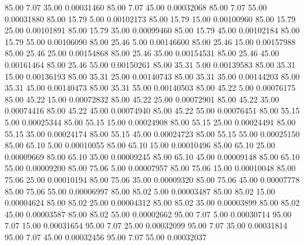      85.00      7.07     35.00     0.00031460
     85.00      7.07     45.00     0.00032068
     85.00      7.07     55.00     0.00031880
     85.00     15.79      5.00     0.00102173
     85.00     15.79     15.00     0.00100960
     85.00     15.79     25.00     0.00101891
     85.00     15.79     35.00     0.00099460
     85.00     15.79     45.00     0.00102184
     85.00     15.79     55.00     0.00106090
     85.00     25.46      5.00     0.00146600
     85.00     25.46     15.00     0.00157988
     85.00     25.46     25.00     0.00154868
     85.00     25.46     35.00     0.00154531
     85.00     25.46     45.00     0.00161464
     85.00     25.46     55.00     0.00150261
     85.00     35.31      5.00     0.00139583
     85.00     35.31     15.00     0.00136193
     85.00     35.31     25.00     0.00140743
     85.00     35.31     35.00     0.00144203
     85.00     35.31     45.00     0.00140473
     85.00     35.31     55.00     0.00140503
     85.00     45.22      5.00     0.00076175
     85.00     45.22     15.00     0.00072832
     85.00     45.22     25.00     0.00072901
     85.00     45.22     35.00     0.00074416
     85.00     45.22     45.00     0.00074940
     85.00     45.22     55.00     0.00076451
     85.00     55.15      5.00     0.00025344
     85.00     55.15     15.00     0.00024908
     85.00     55.15     25.00     0.00024491
     85.00     55.15     35.00     0.00024174
     85.00     55.15     45.00     0.00024723
     85.00     55.15     55.00     0.00025150
     85.00     65.10      5.00     0.00010055
     85.00     65.10     15.00     0.00010496
     85.00     65.10     25.00     0.00009669
     85.00     65.10     35.00     0.00009245
     85.00     65.10     45.00     0.00009148
     85.00     65.10     55.00     0.00009200
     85.00     75.06      5.00     0.00007957
     85.00     75.06     15.00     0.00010048
     85.00     75.06     25.00     0.00010194
     85.00     75.06     35.00     0.00009320
     85.00     75.06     45.00     0.00007778
     85.00     75.06     55.00     0.00006997
     85.00     85.02      5.00     0.00003487
     85.00     85.02     15.00     0.00004624
     85.00     85.02     25.00     0.00004312
     85.00     85.02     35.00     0.00003899
     85.00     85.02     45.00     0.00003587
     85.00     85.02     55.00     0.00002662
     95.00      7.07      5.00     0.00030714
     95.00      7.07     15.00     0.00031654
     95.00      7.07     25.00     0.00032099
     95.00      7.07     35.00     0.00031814
     95.00      7.07     45.00     0.00032456
     95.00      7.07     55.00     0.00032037
